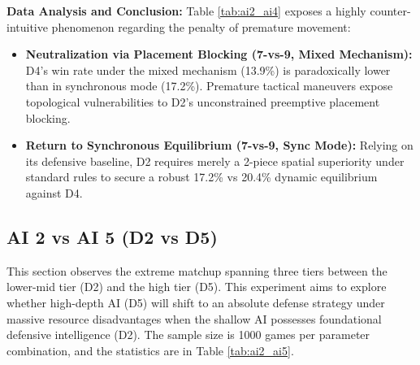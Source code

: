 \textbf{Data Analysis and Conclusion:} 
Table \ref{tab:ai2_ai4} exposes a highly counter-intuitive phenomenon regarding the penalty of premature movement:
\begin{itemize}
    \item \textbf{Neutralization via Placement Blocking (7-vs-9, Mixed Mechanism):} D4's win rate under the mixed mechanism (13.9\%) is paradoxically lower than in synchronous mode (17.2\%). Premature tactical maneuvers expose topological vulnerabilities to D2's unconstrained preemptive placement blocking.
    \item \textbf{Return to Synchronous Equilibrium (7-vs-9, Sync Mode):} Relying on its defensive baseline, D2 requires merely a 2-piece spatial superiority under standard rules to secure a robust 17.2\% vs 20.4\% dynamic equilibrium against D4.
\end{itemize}

\subsection{AI 2 vs AI 5 (D2 vs D5)}
\label{subsec:ai2_ai5}

This section observes the extreme matchup spanning three tiers between the lower-mid tier (D2) and the high tier (D5). This experiment aims to explore whether high-depth AI (D5) will shift to an absolute defense strategy under massive resource disadvantages when the shallow AI possesses foundational defensive intelligence (D2). The sample size is 1000 games per parameter combination, and the statistics are in Table \ref{tab:ai2_ai5}.

\begin{table}[htbp]
    \centering
    \caption{AI 2 vs AI 5 Simulation Data Distribution (Sample Size=1000)}
    \label{tab:ai2_ai5}
\end{table}


